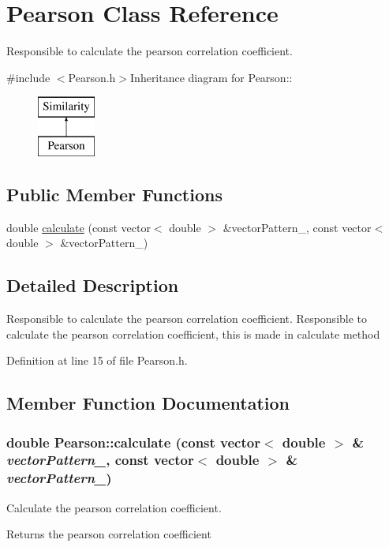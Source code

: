 \hypertarget{classPearson}{
\section{Pearson Class Reference}
\label{classPearson}
}


Responsible to calculate the pearson correlation coefficient.  


{\ttfamily \#include $<$Pearson.h$>$}Inheritance diagram for Pearson::\begin{figure}[H]
\begin{center}
\leavevmode
\includegraphics[height=2cm]{classPearson}
\end{center}
\end{figure}
\subsection*{Public Member Functions}
\begin{DoxyCompactItemize}
\item 
double \hyperlink{classPearson_a71d128fcaecda770e5b36494a916252f}{calculate} (const vector$<$ double $>$ \&vectorPattern\_, const vector$<$ double $>$ \&vectorPattern\_)
\end{DoxyCompactItemize}


\subsection{Detailed Description}
Responsible to calculate the pearson correlation coefficient. Responsible to calculate the pearson correlation coefficient, this is made in calculate method 

Definition at line 15 of file Pearson.h.

\subsection{Member Function Documentation}
\hypertarget{classPearson_a71d128fcaecda770e5b36494a916252f}{
\subsubsection[{calculate}]{\setlength{\rightskip}{0pt plus 5cm}double Pearson::calculate (const vector$<$ double $>$ \& {\em vectorPattern\_}, \/  const vector$<$ double $>$ \& {\em vectorPattern\_})}}
\label{classPearson_a71d128fcaecda770e5b36494a916252f}
Calculate the pearson correlation coefficient. \begin{DoxyReturn}{Returns}
the pearson correlation coefficient 
\end{DoxyReturn}


